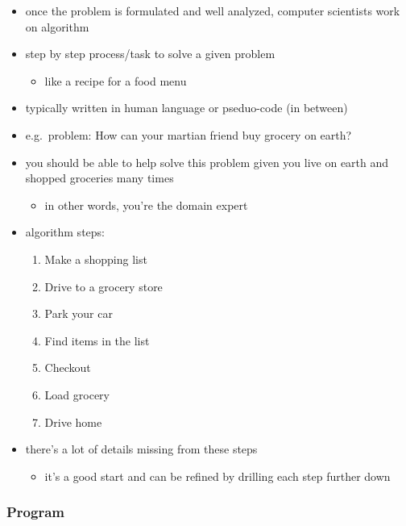 \documentclass[11pt]{article}
\providecommand{\tightlist}{%
      \setlength{\itemsep}{0pt}\setlength{\parskip}{0pt}}
\begin{document}
\begin{itemize}
\tightlist
\item
  once the problem is formulated and well analyzed, computer scientists
  work on algorithm
\item
  step by step process/task to solve a given problem

  \begin{itemize}
  \tightlist
  \item
    like a recipe for a food menu
  \end{itemize}
\item
  typically written in human language or pseduo-code (in between)
\item
  e.g.~problem: How can your martian friend buy grocery on earth?
\item
  you should be able to help solve this problem given you live on earth
  and shopped groceries many times

  \begin{itemize}
  \tightlist
  \item
    in other words, you're the domain expert
  \end{itemize}
\item
  algorithm steps:

  \begin{enumerate}
  \def\labelenumi{\arabic{enumi}.}
  \tightlist
  \item
    Make a shopping list
  \item
    Drive to a grocery store
  \item
    Park your car
  \item
    Find items in the list
  \item
    Checkout
  \item
    Load grocery
  \item
    Drive home
  \end{enumerate}
\item
  there's a lot of details missing from these steps

  \begin{itemize}
  \tightlist
  \item
    it's a good start and can be refined by drilling each step further
    down
  \end{itemize}
\end{itemize}

    \hypertarget{program}{%
\subsubsection{Program}\label{program}}
\end{document}

